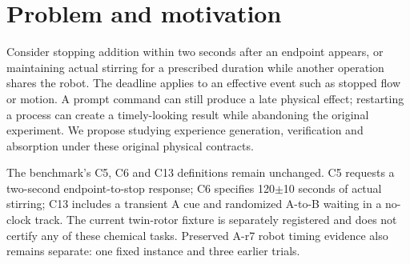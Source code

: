 \documentclass{article}
\begin{document}
\printAffiliationsAndNotice{}
\begin{abstract}
Laboratory operations constrain physical effects, not merely command dispatch.
Dependencies, persistent processes and original event references can make
apparently timely actions violate the task. We develop independently scored
event contracts and examine two components. An exact scheduling candidate
matches exhaustive enumeration on 7,172 synthetic interval conditions; the
preserved earlier planner incorrectly rejects 61 feasible conditions. A separate
MuJoCo experiment executes 12 controlled trajectories across four task graphs,
plus two separately reported sentinels. A reference-preserving graph controller
satisfies all four registered contracts, compared with one for an unguarded
graph controller and none for an independent-window ordering baseline.
These fixed mechanical cases validate interfaces and expose failure modes.
They do not establish learned-policy improvement, chemical outcomes, real-time
agent execution or generalization. The proposed learning study must absorb
verified recovery experience under matched budgets and independent evaluation.
\end{abstract}

\section{Problem and motivation}
Consider stopping addition within two seconds after an endpoint appears, or
maintaining actual stirring for a prescribed duration while another operation
shares the robot. The deadline applies to an effective event such as stopped
flow or motion. A prompt command can still produce a late physical effect;
restarting a process can create a timely-looking result while abandoning the
original experiment. We propose studying experience generation, verification
and absorption under these original physical contracts.

The benchmark's C5, C6 and C13 definitions remain unchanged. C5 requests a
two-second endpoint-to-stop response; C6 specifies 120$\pm$10 seconds of actual
stirring; C13 includes a transient A cue and randomized A-to-B waiting in a
no-clock track. The current twin-rotor fixture is separately registered and
does not certify any of these chemical tasks. Preserved A-r7 robot timing
evidence also remains separate: one fixed instance and three earlier trials.
\end{document}
